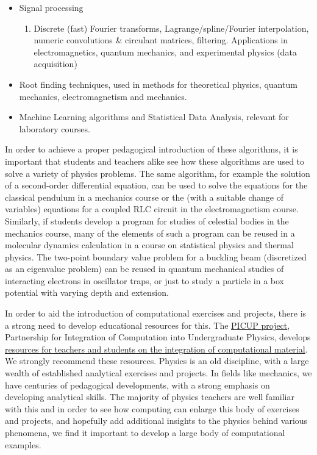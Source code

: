 \documentclass[graybox,envcountchap,sectrefs]{svmult}
\begin{document}
\begin{itemize}
\begin{enumerate}
\end{enumerate}


\item Signal processing
\begin{enumerate}

  \item Discrete (fast) Fourier transforms, Lagrange/spline/Fourier interpolation, numeric convolutions {\&} circulant matrices, filtering. Applications in electromagnetics, quantum mechanics, and experimental physics (data acquisition)

\end{enumerate}


\item Root finding techniques, used in methods for theoretical physics, quantum mechanics, electromagnetism and mechanics.

\item Machine Learning algorithms and Statistical Data Analysis, relevant for laboratory courses.
\end{itemize}


In order to achieve a proper pedagogical introduction of these
algorithms, it is important that students and teachers alike see how
these algorithms are used to solve a variety of physics problems. The
same algorithm, for example the solution of a second-order
differential equation, can be used to solve the equations for the
classical pendulum in a mechanics course or the (with a suitable
change of variables) equations for a coupled RLC circuit in the
electromagnetism course. Similarly, if students develop a program for
studies of celestial bodies in the mechanics course, many of the
elements of such a program can be reused in a molecular dynamics
calculation in a course on statistical physics and thermal
physics. The two-point boundary value problem for a buckling beam
(discretized as an eigenvalue problem) can be reused in quantum
mechanical studies of interacting electrons in oscillator traps, or
just to study a particle in a box potential with varying depth and
extension.

In order to aid the introduction of computational exercises and
projects, there is a strong need to develop educational resources for this. The
\href{{http://www.compadre.org/picup/}}{PICUP project}, Partnership for
Integration of Computation into Undergraduate Physics, develops
\href{{http://www.compadre.org/PICUP/resources/}}{resources for teachers and students on the integration of
computational material}.
We strongly recommend these resources.  Physics is an old discipline,
with a large wealth of established analytical exercises and
projects. In fields like mechanics, we have centuries of pedagogical
developments, with a strong emphasis on developing analytical
skills. The majority of physics teachers are well familiar with this
and in order to see how computing can enlarge this body of exercises
and projects, and hopefully add additional insights to the physics
behind various phenomena, we find it important to develop a large body
of computational examples.
\end{document}
